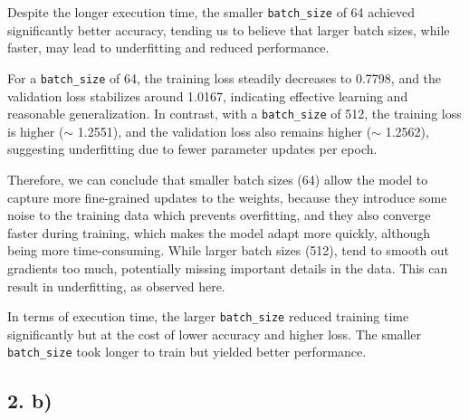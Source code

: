 \documentclass[a4paper, 12pt]{article}
\begin{document}
Despite the longer execution time, the smaller \texttt{batch\_size} of 64 achieved significantly better accuracy, tending us to believe that larger batch sizes, while faster, may lead to underfitting and reduced performance.

For a \texttt{batch\_size} of 64, the training loss steadily decreases to 0.7798, and the validation loss stabilizes around 1.0167, indicating effective learning and reasonable generalization. In contrast, with a \texttt{batch\_size} of 512, the training loss is higher ($\sim$ 1.2551), and the validation loss also remains higher ($\sim$ 1.2562), suggesting underfitting due to fewer parameter updates per epoch.

Therefore, we can conclude that smaller batch sizes (64) allow the model to capture more fine-grained updates to the weights, because they introduce some noise to the training data which prevents overfitting, and they also converge faster during training, which makes the model adapt more quickly, although being more time-consuming. While larger batch sizes (512), tend to smooth out gradients too much, potentially missing important details in the data. This can result in underfitting, as observed here.

In terms of execution time, the larger \texttt{batch\_size} reduced training time significantly but at the cost of lower accuracy and higher loss. The smaller \texttt{batch\_size} took longer to train but yielded better performance. 

\subsection*{2. b)}
\end{document}
